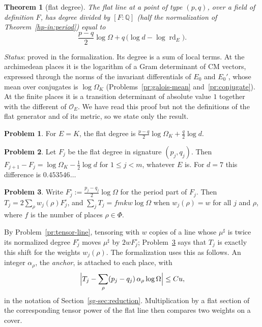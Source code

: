 \documentclass[reqno]{amsart}
\theoremstyle{definition}
\newtheorem{problem}{Problem}[section]
\theoremstyle{plain}
\newtheorem{theorem}{Theorem}[section]
\theoremstyle{remark}
\newcommand{\Q}{\mathbb Q}
\newcommand{\Oc}{\mathcal O}
\newcommand{\rd}{\operatorname{rd}}
\newcommand{\mus}{\mu^\sharp}
\begin{document}
\begin{theorem}[flat degree]\label{thm:flat}
The flat line at a point of type \((p, q)\), over a field of definition \(F\), has degree divided by \([F:\Q]\) (half the normalization of Theorem~\ref{hp-in:period}) equal to
\[
  \frac{p - q}{2}\log\Omega + q\,\bigl(\log d - \log\rd_E\bigr) .
\]
\end{theorem}
\noindent\emph{Status}: proved in the formalization.  Its degree is a sum of local terms.  At the archimedean places it is the logarithm of a Gram determinant of CM vectors, expressed through the norms of the invariant differentials of \(E_0\) and \(E_0'\), whose mean over conjugates is \(\log\Omega_K\) (Problems~\ref{pr:galois-mean} and~\ref{pr:conjugate}).  At the finite places it is a transition determinant of absolute value \(1\) together with the different of \(\Oc_E\).  We have read this proof but not the definitions of the flat generator and of its metric, so we state only the result.

\begin{problem}\label{pr:flat-K}
For \(E = K\), the flat degree is \(\frac{p-q}2\log\Omega_K + \frac q2\log d\).
\end{problem}

\begin{problem}\label{pr:flat-lifts}
Let \(F_j\) be the flat degree in signature \((p_j, q_j)\).  Then \(F_{j+1} - F_j = \log\Omega_K - \frac12\log d\) for \(1 \le j < m\), whatever \(E\) is.  For \(d = 7\) this difference is \(0.453546\ldots\)
\end{problem}

\begin{problem}\label{pr:period-part}
Write \(F^\circ_j := \frac{p_j - q_j}{2}\log\Omega\) for the period part of \(F_j\).  Then \(T_j = 2\sum_\rho w_j(\rho)F^\circ_j\), and \(\sum_jT_j = fmkw\log\Omega\) when \(w_j(\rho) = w\) for all \(j\) and \(\rho\), where \(f\) is the number of places \(\rho \in \Phi\).
\end{problem}

By Problem~\ref{pr:tensor-line}, tensoring with \(w\) copies of a line whose \(\mus\) is twice its normalized degree \(F^\circ_j\) moves \(\mus\) by \(2wF^\circ_j\); Problem~\ref{pr:period-part} says that \(T_j\) is exactly this shift for the weights \(w_j(\rho)\).  The formalization uses this as follows.  An integer \(\alpha_\rho\), the \emph{anchor}, is attached to each place, with
\[
  \Bigl\lvert T_j - \sum_\rho(p_j - q_j)\,\alpha_\rho\log\Omega\Bigr\rvert \le Cu ,
\]
in the notation of Section~\ref{sg-sec:reduction}.  Multiplication by a flat section of the corresponding tensor power of the flat line then compares two weights on a cover.
\end{document}
